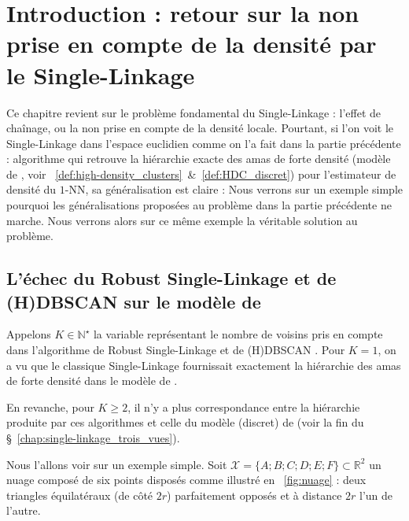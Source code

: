 \chapter{Introduction : retour sur la non prise en compte de la densité par le Single-Linkage}

Ce chapitre revient sur le problème fondamental du Single-Linkage : l'effet de chaînage, ou la non prise en compte de la densité locale.
Pourtant, si l'on voit le Single-Linkage dans l'espace euclidien comme on l'a fait dans la partie précédente : algorithme qui retrouve la hiérarchie exacte des amas de forte densité (modèle de , voir \Def~\ref{def:high-density_clusters}~\&~\ref{def:HDC_discret}) pour l'estimateur de densité du $1$-NN, sa généralisation est claire :
Nous verrons sur un exemple simple pourquoi les généralisations proposées au problème dans la partie précédente ne marche. 
Nous verrons alors sur ce même exemple la véritable solution au problème.





\section{L'échec du Robust Single-Linkage et de (H)DBSCAN sur le modèle de }

Appelons $K\in \mathbb N^\star$ la variable représentant le nombre de voisins pris en compte dans l'algorithme de Robust Single-Linkage \cite{RobustSingleLinkage2010} et de (H)DBSCAN \cite{HDBSCAN, HDBSCAN2017}.
Pour $K = 1$, on a vu que le classique Single-Linkage fournissait exactement la hiérarchie des amas de forte densité dans le modèle de .

En revanche, pour $K\ge2$, il n'y a plus correspondance entre la hiérarchie produite par ces algorithmes et celle du modèle (discret) de  (voir la fin du \S~\ref{chap:single-linkage_trois_vues}). 

Nous l'allons voir sur un exemple simple. Soit $\mathcal X = \bigl\{ A ; B ; C ; D ; E ; F\bigr\} \subset \mathbb R^2$ un nuage composé de six points disposés comme illustré en \Fig~\ref{fig:nuage} : deux triangles équilatéraux (de côté $2r$) parfaitement opposés et à distance $2r$ l'un de l'autre.


